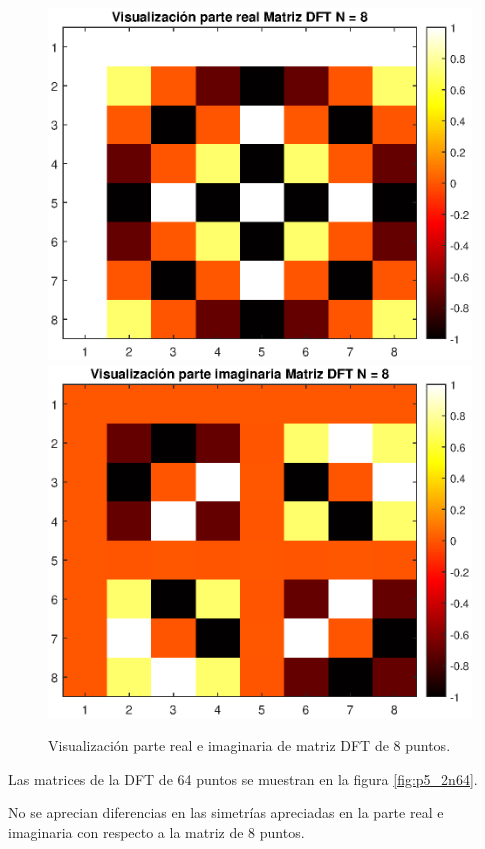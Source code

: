 \begin{enumerate}
    \begin{figure} [H]
        \centering
        \includegraphics[width = .7\linewidth]{Figuras/P5_2_1.eps}
        \includegraphics[width = .7\linewidth]{Figuras/P5_2_2.eps}
        \caption{Visualización parte real e imaginaria de matriz DFT de 8 puntos.}
        \label{fig:p5_2n8}
    \end{figure}
    
    Las matrices de la DFT de 64 puntos se muestran en la figura \ref{fig:p5_2n64}.
    
    No se aprecian diferencias en las simetrías apreciadas en la parte real e imaginaria con respecto a la matriz de 8 puntos.
    

\end{enumerate}

